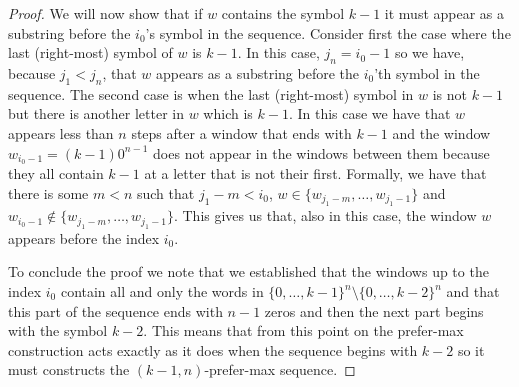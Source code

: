 \documentclass{article}
\theoremstyle{definition}
\begin{document}
\begin{proof}
	We will now show that if $w$ contains the symbol $k-1$ it must appear as a
	substring before the $i_0$'s symbol in the sequence. Consider first the case
	where the last (right-most) symbol of $w$ is $k-1$. In this case, $j_n=i_{0}-1$
	so we have, because $j_1 < j_n$, that $w$ appears as a substring before the
	$i_0$'th symbol in the sequence. The second case is when the last (right-most)
	symbol in $w$ is not $k-1$ but there is another letter in $w$ which is $k-1$. In
	this case we have that $w$ appears less than $n$ steps after a window that ends
	with $k-1$ and the window $w_{i_0-1}=(k-1)0^{n-1}$ does not
	appear in the windows between them because they all contain $k-1$ at a letter
	that is not  their first. 
	Formally, we have that there is some $m<n$ such that 
	$j_1-m < i_0$,  $w \in \{w_{{j_1}-m},\dots,w_{j_1-1}\}$ and 
	$w_{i_0-1} \notin \{w_{{j_1}-m},\dots,w_{j_1-1}\}$. This gives us that, also in this 
	case, the window $w$ appears before	the index $i_0$.
	
	To conclude the proof we note that we established that the windows up to the
	index $i_0$ contain all and only the words in $\{0,\dots,k-1\}^n \setminus
	\{0,\dots,k-2\}^n$ and that this part of the sequence ends with $n-1$ zeros and
	then the next part begins with the symbol $k-2$. This means that from this point
	on the prefer-max construction acts exactly as it does when the sequence begins
	with $k-2$ so it must constructs the $(k-1,n)$-prefer-max sequence.
\end{proof}  



{}

\end{document}

